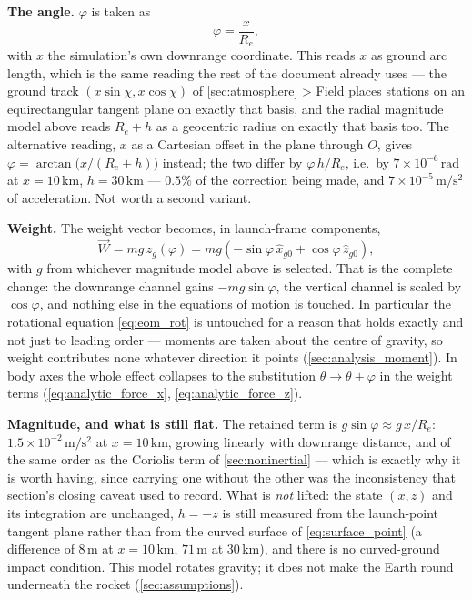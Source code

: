 {\textbf{The angle.} $\varphi$ is taken as
\begin{equation} \label{eq:phi_downrange}
    \varphi = \frac{x}{R_e},
\end{equation}
with $x$ the simulation's own downrange coordinate. This reads $x$ as ground arc length, which
is the same reading the rest of the document already uses --- the ground track
$(x\sin\chi, x\cos\chi)$ of \autoref{sec:atmosphere} > Field places stations on an
equirectangular tangent plane on exactly that basis, and the radial magnitude model above reads
$R_e + h$ as a geocentric radius on exactly that basis too. The alternative reading, $x$ as a
Cartesian offset in the plane through $O$, gives $\varphi = \arctan\!\bigl(x/(R_e+h)\bigr)$
instead; the two differ by $\varphi\,h/R_e$, i.e.\ by $7\times10^{-6}\,\mathrm{rad}$ at
$x = 10\,\mathrm{km}$, $h = 30\,\mathrm{km}$ --- $0.5\%$ of the correction being made, and
$7\times10^{-5}\,\mathrm{m/s^2}$ of acceleration. Not worth a second variant.

\textbf{Weight.} The weight vector becomes, in launch-frame components,
\begin{equation} \label{eq:weight_rotated}
    \vec{W} = mg\,\hat{z}_g(\varphi)
        = mg\left(-\sin\varphi\,\hat{x}_{g0} + \cos\varphi\,\hat{z}_{g0}\right),
\end{equation}
with $g$ from whichever magnitude model above is selected. That is the complete change: the
downrange channel gains $-mg\sin\varphi$, the vertical channel is scaled by $\cos\varphi$, and
nothing else in the equations of motion is touched. In particular the rotational equation
\autoref{eq:eom_rot} is untouched for a reason that holds exactly and not just to leading order
--- moments are taken about the centre of gravity, so weight contributes none whatever direction
it points (\autoref{sec:analysis_moment}). In body axes the whole effect collapses to the
substitution $\theta \to \theta + \varphi$ in the weight terms
(\autoref{eq:analytic_force_x}, \autoref{eq:analytic_force_z}).

\textbf{Magnitude, and what is still flat.} The retained term is
$g\sin\varphi \approx g\,x/R_e$: $1.5\times10^{-2}\,\mathrm{m/s^2}$ at $x = 10\,\mathrm{km}$,
growing linearly with downrange distance, and of the same order as the Coriolis term of
\autoref{sec:noninertial} --- which is exactly why it is worth having, since carrying one
without the other was the inconsistency that section's closing caveat used to record. What is
\emph{not} lifted: the state $(x, z)$ and its integration are unchanged, $h = -z$ is still
measured from the launch-point tangent plane rather than from the curved surface of
\autoref{eq:surface_point} (a difference of $8\,\mathrm{m}$ at $x = 10\,\mathrm{km}$,
$71\,\mathrm{m}$ at $30\,\mathrm{km}$), and there is no curved-ground impact condition. This
model rotates gravity; it does not make the Earth round underneath the rocket
(\autoref{sec:assumptions}).}

